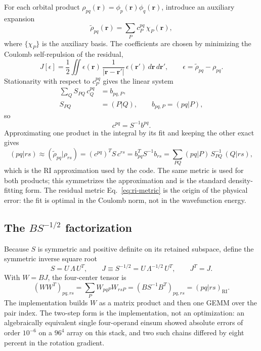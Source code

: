 For each orbital product
$\rho_{pq}(\mathbf r)=\phi_p(\mathbf r)\phi_q(\mathbf r)$, introduce an
auxiliary expansion
\begin{equation}
  \tilde\rho_{pq}(\mathbf r)
  = \sum_{P} c_P^{pq}\,\chi_P(\mathbf r),
  \label{eq:ri-fit}
\end{equation}
where $\{\chi_P\}$ is the auxiliary basis.  The coefficients are chosen
by minimizing the Coulomb self-repulsion of the residual,
\begin{equation}
  J[\epsilon]
  = \frac{1}{2}\iint
    \epsilon(\mathbf r)\,\frac{1}{|\mathbf r-\mathbf r'|}\,
    \epsilon(\mathbf r')\,d\mathbf r\,d\mathbf r',
  \qquad
  \epsilon = \tilde\rho_{pq}-\rho_{pq}.
  \label{eq:ri-metric}
\end{equation}
Stationarity with respect to $c_P^{pq}$ gives the linear system
\begin{align}
  \sum_{Q} S_{PQ}\,c_Q^{pq} &= b_{pq,P}, \nonumber\\
  S_{PQ} &= (P|Q), \qquad b_{pq,P}=(pq|P),
  \label{eq:ri-normal}
\end{align}
so
\begin{equation}
  c^{pq}=S^{-1}b^{pq}.
  \label{eq:ri-coeff}
\end{equation}
Approximating one product in the integral by its fit and keeping the
other exact gives
\begin{equation}
  (pq|rs)
  \approx \left(\tilde\rho_{pq}\big|\rho_{rs}\right)
  = \left(c^{pq}\right)^{T} S\,c^{rs}
  = b_{pq}^{T} S^{-1} b_{rs}
  = \sum_{PQ}(pq|P)\,S^{-1}_{PQ}\,(Q|rs),
  \label{eq:ri}
\end{equation}
which is the RI approximation used by the code.  The same metric is
used for both products; this symmetrizes the approximation and is the
standard density-fitting form.  The residual metric
Eq.~\eqref{eq:ri-metric} is the origin of the physical error: the fit
is optimal in the Coulomb norm, not in the wavefunction energy.

\subsection{The \texorpdfstring{$B S^{-1/2}$}{B S^-1/2} factorization}

Because $S$ is symmetric and positive definite on its retained
subspace, define the symmetric inverse square root
\begin{equation}
  S = U\,\Lambda\,U^{T},
  \qquad
  J \equiv S^{-1/2}
  = U\,\Lambda^{-1/2}\,U^{T},
  \qquad
  J^{T}=J.
  \label{eq:ri-j}
\end{equation}
With $W=BJ$, the four-center tensor is
\begin{equation}
  \left(W W^{T}\right)_{pq,rs}
  = \sum_{P} W_{pqP}W_{rsP}
  = \left(B S^{-1}B^{T}\right)_{pq,rs}
  = (pq|rs)_{\mathrm{RI}}.
  \label{eq:ri-assembly}
\end{equation}
The implementation builds $W$ as a matrix product and then one GEMM
over the pair index.  The two-step form is the implementation, not an
optimization: an algebraically equivalent single four-operand einsum
showed absolute errors of order $10^{-6}$ on a $96^4$ array on this
stack, and two such chains differed by eight percent in the rotation
gradient.

